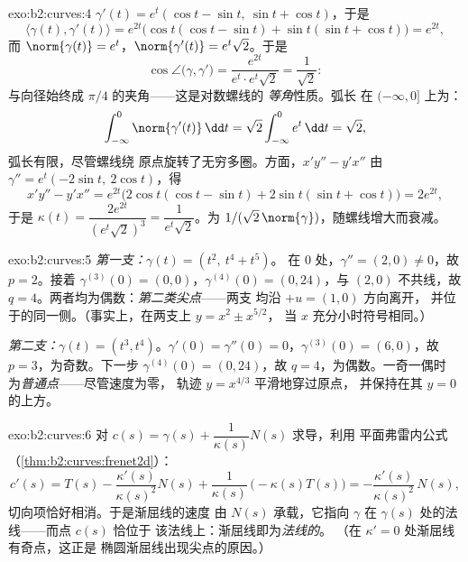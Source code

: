 \begin{solution}{exo:b2:curves:4}
$\gamma'(t) = e^t(\cos t - \sin t,\ \sin t + \cos t)$，于是
\[
\langle \gamma(t), \gamma'(t)\rangle = e^{2t}
\bigl(\cos t(\cos t - \sin t) + \sin t(\sin t + \cos t)\bigr)
= e^{2t},
\]
而 $\norm{\gamma(t)} = e^t$，$\norm{\gamma'(t)} =
e^t\sqrt 2$。于是
\[
\cos\angle\bigl(\gamma, \gamma'\bigr)
= \frac{e^{2t}}{e^t \cdot e^t\sqrt2} = \frac{1}{\sqrt2} :
\]
与向径始终成 $\pi/4$ 的夹角——这是对数螺线的
\emph{等角}性质。弧长
在 $(-\infty, 0]$ 上为：
\[
\int_{-\infty}^0 \norm{\gamma'(t)}\,\dd t
= \sqrt2\int_{-\infty}^0 e^t\,\dd t = \sqrt 2 ,
\]
弧长有限，尽管螺线绕
原点旋转了无穷多圈。方面，$x'y'' - y'x''$ 由 $\gamma'' =
e^t(-2\sin t,\ 2\cos t)$，得
\[
x'y'' - y'x'' = e^{2t}\bigl(2\cos t(\cos t - \sin t)
+ 2\sin t(\sin t + \cos t)\bigr) = 2e^{2t},
\]
于是 $\kappa(t) = \dfrac{2e^{2t}}{(e^t\sqrt2)^3} =
\dfrac{1}{e^t\sqrt2}$。为 $1/(\sqrt2\,
\norm{\gamma})$，随螺线增大而衰减。
\end{solution}

\begin{solution}{exo:b2:curves:5}
\emph{第一支：}$\gamma(t) = (t^2,\ t^4 + t^5)$。
在 $0$ 处，$\gamma'' = (2, 0) \neq 0$，故 $p = 2$。接着 $\gamma^{(3)}(0)
= (0, 0)$，$\gamma^{(4)}(0) = (0, 24)$，与 $(2,
0)$ 不共线，故 $q = 4$。两者均为偶数：\emph{第二类尖点}——两支
均沿 $+u = (1,0)$ 方向离开，
并位于的同一侧。（事实上，在两支上 $y = x^2 \pm x^{5/2}$，
当 $x$ 充分小时符号相同。）

\emph{第二支：}$\gamma(t) = (t^3, t^4)$。$\gamma'(0) =
\gamma''(0) = 0$，$\gamma^{(3)}(0) = (6, 0)$，故 $p = 3$，为奇数。下一步
$\gamma^{(4)}(0) = (0, 24)$，故 $q = 4$，为偶数。一奇一偶时
为\emph{普通点}——尽管速度为零，
轨迹 $y = x^{4/3}$ 平滑地穿过原点，
并保持在其 $y = 0$ 的上方。
\end{solution}

\begin{solution}{exo:b2:curves:6}
对 $c(s) = \gamma(s) + \dfrac{1}{\kappa(s)}N(s)$ 求导，利用
平面弗雷内公式
（\cref{thm:b2:curves:frenet2d}）：
\[
c'(s) = T(s) - \frac{\kappa'(s)}{\kappa(s)^2}N(s)
+ \frac{1}{\kappa(s)}\,\bigl(-\kappa(s)T(s)\bigr)
= -\frac{\kappa'(s)}{\kappa(s)^2}\,N(s) ,
\]
切向项恰好相消。于是渐屈线的速度
由 $N(s)$ 承载，它指向
$\gamma$ 在 $\gamma(s)$ 处的法线——而点 $c(s)$ 恰位于
该法线上：渐屈线即为\emph{法线的}。
（在 $\kappa' = 0$ 处渐屈线有奇点，这正是
椭圆渐屈线出现尖点的原因。）
\end{solution}

